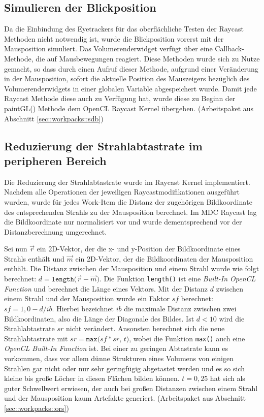 \subsection{Simulieren der Blickposition}\label{sec::ida::sdb}
Da die Einbindung des Eyetrackers für das oberflächliche Testen der Raycast Methoden nicht notwendig ist, wurde die Blickposition vorerst mit der Mausposition simuliert.
Das Volumerenderwidget verfügt über eine Callback-Methode, die auf Mausbewegungen reagiert.
Diese Methoden wurde sich zu Nutze gemacht, so dass durch einen Aufruf dieser Methode, aufgrund einer Veränderung in der Mausposition, sofort die aktuelle Position des Mauszeigers bezüglich des Volumerenderwidgets in einer globalen Variable abgespeichert wurde.
Damit jede Raycast Methode diese auch zu Verfügung hat, wurde diese zu Beginn der paintGL() Methode dem OpenCL Raycast Kernel übergeben. (Arbeitspaket aus Abschnitt \ref{sec::workpacks::sdb})

\subsection{Reduzierung der Strahlabtastrate im peripheren Bereich}\label{sec::ida::rdsifb}
Die Reduzierung der Strahlabtastrate wurde im Raycast Kernel implementiert.
Nachdem alle Operationen der jeweiligen Raycastmodifikationen ausgeführt wurden, wurde für jedes Work-Item die Distanz der zugehörigen Bildkoordinate des entsprechenden Strahls zu der Mausposition berechnet.
Im MDC Raycast lag die Bildkoordinate nur normalisiert vor und wurde dementsprechend vor der Distanzberechnung umgerechnet.

Sei nun $\vec{r}$ ein 2D-Vektor, der die x- und y-Position der Bildkoordinate eines Strahls enthält und $\vec{m}$ ein 2D-Vektor, der die Bildkoordinaten der Mausposition enthält.
Die Distanz zwischen der Mausposition und einem Strahl wurde wie folgt berechnet: $d = \texttt{length(}\vec{r}-\vec{m}\texttt{)}$.
Die Funktion \texttt{length()} ist eine \emph{Built-In OpenCL Function} und berechnet die Länge eines Vektors.
Mit der Distanz $d$ zwischen einem Strahl und der Mausposition wurde ein Faktor $sf$ berechnet: $sf = 1,0 - d  / ib$.
Hierbei bezeichnet $ib$ die maximale Distanz zwischen zwei Bildkoordinaten, also die Länge der Diagonale des Bildes.
Ist $d < 10$ wird die Strahlabtastrate $sr$ nicht verändert.
Ansonsten berechnet sich die neue Strahlabtastrate mit $sr = \texttt{max(}sf * sr,\,t\texttt{)}$, wobei die Funktion \texttt{max()} auch eine \emph{OpenCL Built-In Function} ist.
Bei einer zu geringen Abtastrate kann es vorkommen, dass vor allem dünne Strukturen eines Volumens von einigen Strahlen gar nicht oder nur sehr geringfügig abgetastet werden und es so sich kleine bis große Löcher in diesen Flächen bilden können.
$t = 0,25$ hat sich als guter Schwellwert erwiesen, der auch bei großen Distanzen zwischen einem Strahl und der Mausposition kaum Artefakte generiert. (Arbeitspaket aus Abschnitt \ref{sec::workpacks::ors})

